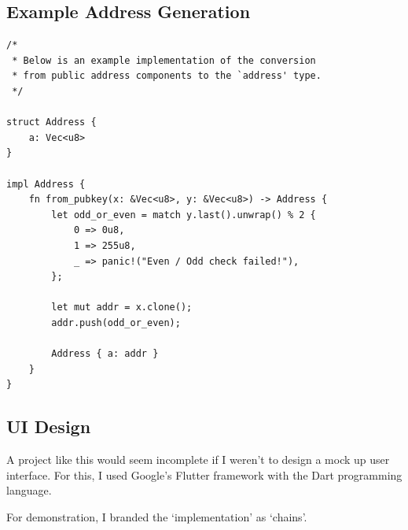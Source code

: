 \documentclass{article}
\begin{document}
\newpage

\subsection{Example Address Generation}
\begin{verbatim}
/*
 * Below is an example implementation of the conversion
 * from public address components to the `address' type.
 */

struct Address {
    a: Vec<u8>
}

impl Address {
    fn from_pubkey(x: &Vec<u8>, y: &Vec<u8>) -> Address {
        let odd_or_even = match y.last().unwrap() % 2 {
            0 => 0u8,
            1 => 255u8,
            _ => panic!("Even / Odd check failed!"),
        };
        
        let mut addr = x.clone();
        addr.push(odd_or_even);
        
        Address { a: addr }
    }
}

\end{verbatim}

\newpage

\subsection{UI Design}
A project like this would seem incomplete if I weren't to design a mock up user interface. For this, I used Google's Flutter framework\cite{flutter_framework} with the Dart programming language\cite{dart_lang}.

For demonstration, I branded the `implementation' as `chains'.

\vspace{0.8cm}
\end{document}
